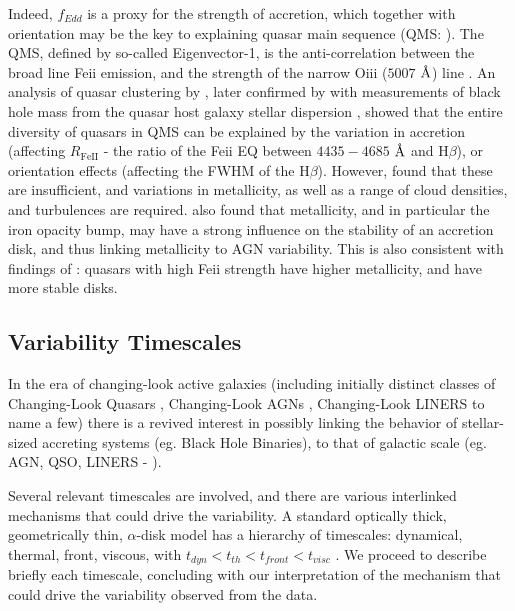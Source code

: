 \documentclass[twocolumn]{aastex62}
\let\oldAA\AA
\renewcommand{\AA}{\text{\normalfont\oldAA}}
\begin{document}
Indeed, $f_{Edd}$ is a proxy for the strength of accretion, which together with orientation may be the key to explaining quasar main sequence (QMS: \citealt{shen2014, marziani2018}). The QMS, defined by so-called Eigenvector-1, is the anti-correlation between the broad line Fe{\sc ii} emission, and the strength of the narrow O{\sc iii} ($5007$ $\mbox{\AA}$) line \citep{wang1996}. An analysis of quasar clustering by \citet{shen2014}, later confirmed by \citet{sun2015} with measurements of  black hole mass from the quasar host galaxy stellar dispersion \citep{ferrarese2000, kormendy2013}, showed that the entire diversity of quasars in  QMS can be explained by the variation in accretion (affecting $R_{\mathrm{Fe  II}}$ - the ratio of the  Fe{\sc ii} EQ  between $4435-4685$ $\mbox{\AA}$ and H$\beta$), or orientation effects (affecting the FWHM of the H$\beta$). However, \citet{panda2019a, panda2019b} found that these are insufficient, and variations in metallicity, as well as a range of cloud densities, and turbulences are required.  \cite{jiang2016} also found that metallicity, and in particular the iron opacity bump, may have a strong influence on the stability of an accretion disk, and thus linking metallicity to AGN variability. This is also consistent with findings of \cite{sun2018}: quasars with high  Fe{\sc ii} strength have higher metallicity, and have more stable disks. 


\subsection{Variability Timescales}

In the era of changing-look active galaxies (including initially distinct classes of Changing-Look Quasars \citep{lamassa2015, macleod2019}, Changing-Look AGNs \citep{marchese2012, bianchi2009,risaliti2009}, Changing-Look LINERS \citep{frederick2019} to name a few) there is a revived interest in possibly linking the behavior of stellar-sized accreting systems (eg. Black Hole Binaries),  to that of galactic scale (eg. AGN, QSO, LINERS  - \citealt{noda2018, ruan2019}). 

Several relevant timescales are involved, and there are various interlinked mechanisms that could drive the variability. A standard optically thick, geometrically thin, $\alpha$-disk model has a hierarchy of timescales: dynamical, thermal, front, viscous, with   $t_{dyn} < t_{th} < t_{front}  < t_{visc} $ \citep{netzer2013, frank2002}. We proceed to describe briefly each timescale, concluding with our interpretation of the mechanism that could drive the variability observed from the data. 
\end{document}
